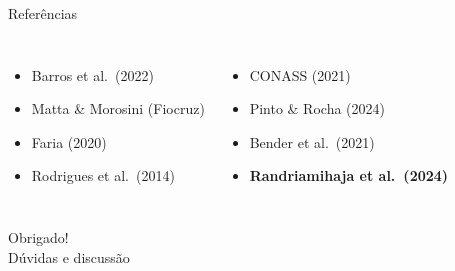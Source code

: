 \documentclass[aspectratio=169]{beamer}
\begin{document}
\begin{frame}{Refer\^encias}
  \begin{columns}[T]
    \begin{itemize}
      \item Barros et al.\ (2022)
      \item Matta \& Morosini (Fiocruz)
      \item Faria (2020)
      \item Rodrigues et al.\ (2014)
    \end{itemize}
    \begin{itemize}
      \item CONASS (2021)
      \item Pinto \& Rocha (2024)
      \item Bender et al.\ (2021)
      \item \textbf{Randriamihaja et al.\ (2024)}
    \end{itemize}
  \end{columns}
\end{frame}

\begin{frame}{}
  \centering
  \vspace{1cm}
  {\Huge Obrigado!}\\[1em]
  {\large D\'uvidas e discuss\~ao}
\end{frame}
\end{document}
